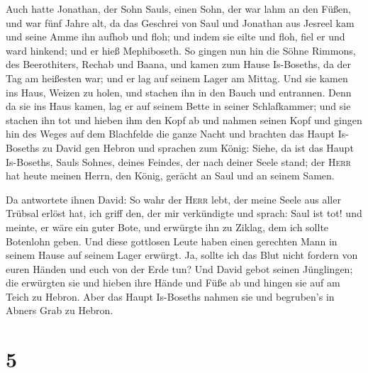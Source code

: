  Auch hatte Jonathan, der Sohn Sauls, einen Sohn, der war
lahm an den Füßen, und war fünf Jahre alt, da das Geschrei von Saul und
Jonathan aus Jesreel kam und seine Amme ihn aufhob und floh; und indem
sie eilte und floh, fiel er und ward hinkend; und er hieß Mephiboseth.
 So gingen nun hin die Söhne Rimmons, des Beerothiters,
Rechab und Baana, und kamen zum Hause Is-Boseths, da der Tag am
heißesten war; und er lag auf seinem Lager am Mittag.  Und
sie kamen ins Haus, Weizen zu holen, und stachen ihn in den Bauch und
entrannen.  Denn da sie ins Haus kamen, lag er auf seinem
Bette in seiner Schlafkammer; und sie stachen ihn tot und hieben ihm den
Kopf ab und nahmen seinen Kopf und gingen hin des Weges auf dem
Blachfelde die ganze Nacht  und brachten das Haupt
Is-Boseths zu David gen Hebron und sprachen zum König: Siehe, da ist das
Haupt Is-Boseths, Sauls Sohnes, deines Feindes, der nach deiner Seele
stand; der \textsc{Herr} hat heute meinen Herrn, den König, gerächt an
Saul und an seinem Samen.

 Da antwortete ihnen David: So wahr der \textsc{Herr}
lebt, der meine Seele aus aller Trübsal erlöst hat,  ich
griff den, der mir verkündigte und sprach: Saul ist tot! und meinte, er
wäre ein guter Bote, und erwürgte ihn zu Ziklag, dem ich sollte
Botenlohn geben.  Und diese gottlosen Leute haben einen
gerechten Mann in seinem Hause auf seinem Lager erwürgt. Ja, sollte ich
das Blut nicht fordern von euren Händen und euch von der Erde tun?
 Und David gebot seinen Jünglingen; die erwürgten sie und
hieben ihre Hände und Füße ab und hingen sie auf am Teich zu Hebron.
Aber das Haupt Is-Boseths nahmen sie und begruben's in Abners Grab zu
Hebron.

\hypertarget{section-4}{%
\section{5}\label{section-4}}


